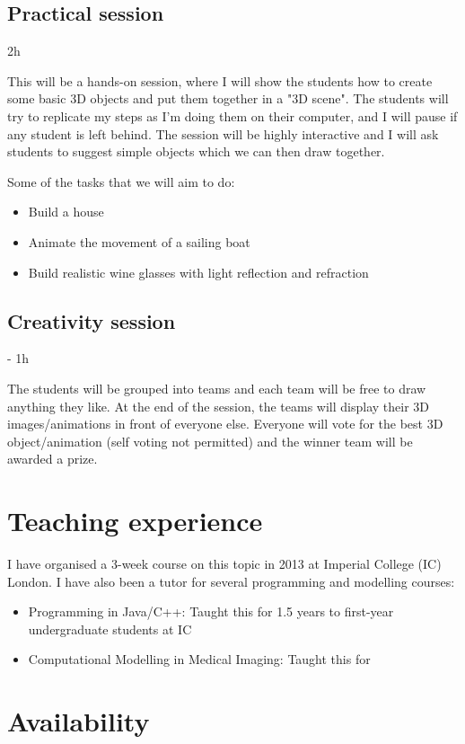 \documentclass[11pt,a4paper]{report}
\begin{document}
\subsection{Practical session} 2h

This will be a hands-on session, where I will show the students how to create some basic 3D objects and put them together in a "3D scene". The students will try to replicate my steps as I'm doing them on their computer, and I will pause if any student is left behind. The session will be highly interactive and I will ask students to suggest simple objects which we can then draw together.

Some of the tasks that we will aim to do:
\begin{itemize}
 \item Build a house
 \item Animate the movement of a sailing boat
 \item Build realistic wine glasses with light reflection and refraction
\end{itemize}


\subsection{Creativity session} - 1h

The students will be grouped into teams and each team will be free to draw anything they like. At the end of the session, the teams will display their 3D images/animations in front of everyone else. Everyone will vote for the best 3D object/animation (self voting not permitted) and the winner team will be awarded a prize.


\section{Teaching experience}

I have organised a 3-week course on this topic in 2013 at Imperial College (IC) London. I have also been a tutor for several programming and modelling courses:
\begin{itemize}
 \item Programming in Java/C++: Taught this for 1.5 years to first-year undergraduate students at IC
 \item Computational Modelling in Medical Imaging: Taught this for 
\end{itemize}




\section{Availability}
\end{document}
